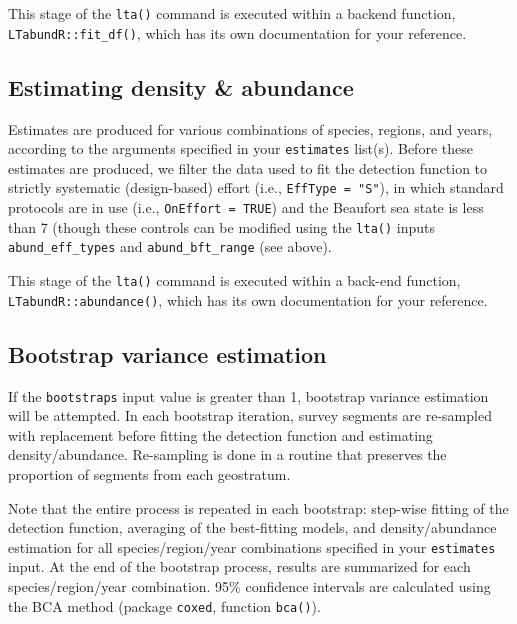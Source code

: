 \documentclass[
]{book}
\begin{document}
This stage of the \texttt{lta()} command is executed within a backend function, \texttt{LTabundR::fit\_df()}, which has its own documentation for your reference.

\hypertarget{estimating-density-abundance}{%
\subsection*{Estimating density \& abundance}\label{estimating-density-abundance}}

Estimates are produced for various combinations of species, regions, and years, according to the arguments specified in your \texttt{estimates} list(s). Before these estimates are produced, we filter the data used to fit the detection function to strictly systematic (design-based) effort (i.e., \texttt{EffType\ =\ "S"}), in which standard protocols are in use (i.e., \texttt{OnEffort\ =\ TRUE}) and the Beaufort sea state is less than 7 (though these controls can be modified using the \texttt{lta()} inputs \texttt{abund\_eff\_types} and \texttt{abund\_bft\_range} (see above).

This stage of the \texttt{lta()} command is executed within a back-end function, \texttt{LTabundR::abundance()}, which has its own documentation for your reference.

\hypertarget{bootstrap-variance-estimation}{%
\subsection*{Bootstrap variance estimation}\label{bootstrap-variance-estimation}}

If the \texttt{bootstraps} input value is greater than 1, bootstrap variance estimation will be attempted. In each bootstrap iteration, survey segments are re-sampled with replacement before fitting the detection function and estimating density/abundance. Re-sampling is done in a routine that preserves the proportion of segments from each geostratum.

Note that the entire process is repeated in each bootstrap: step-wise fitting of the detection function, averaging of the best-fitting models, and density/abundance estimation for all species/region/year combinations specified in your \texttt{estimates} input. At the end of the bootstrap process, results are summarized for each species/region/year combination. 95\% confidence intervals are calculated using the BCA method (package \texttt{coxed}, function \texttt{bca()}).
\end{document}
